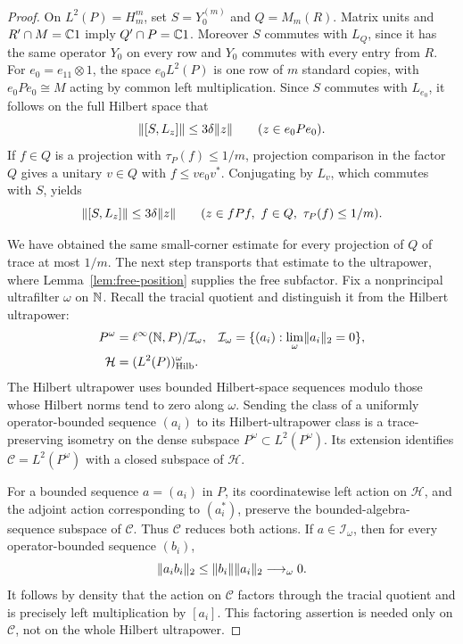\begin{proof}
On \(L^2(P)=H_m^m\), set \(S=Y_0^{(m)}\) and \(Q=M_m(R)\).
Matrix units and \(R'\cap M=\mathbb C1\) imply \(Q'\cap P=\mathbb C1\).
Moreover \(S\) commutes with \(L_Q\), since it has the same operator
\(Y_0\) on every row and \(Y_0\) commutes with every entry from \(R\).
For \(e_0=e_{11}\otimes1\), the space \(e_0L^2(P)\) is one row of
\(m\) standard copies, with \(e_0Pe_0\cong M\) acting by common
left multiplication.  Since \(S\) commutes with \(L_{e_0}\), it follows
on the full Hilbert space that
\[
 \lVert[S,L_z]\rVert\leq3\delta\lVert z\rVert\qquad(z\in e_0Pe_0).
\]
If \(f\in Q\) is a projection with \(\tau_P(f)\leq1/m\), projection
comparison in the factor \(Q\) gives a unitary \(v\in Q\) with
\(f\leq ve_0v^*\).  Conjugating by \(L_v\), which commutes with
\(S\), yields
\[
 \lVert[S,L_z]\rVert\leq3\delta\lVert z\rVert
       \qquad(z\in fPf,\ f\in Q,\ \tau_P(f)\leq1/m).
\]

We have obtained the same small-corner estimate for every projection
of $Q$ of trace at most $1/m$. The next step transports that estimate
to the ultrapower, where Lemma~\ref{lem:free-position} supplies the
free subfactor. Fix a nonprincipal ultrafilter $\omega$ on $\mathbb N$.
Recall the tracial quotient and distinguish it from the Hilbert
ultrapower:
\[
 \begin{aligned}
 P^\omega&=\ell^\infty(\mathbb N,P)/\mathcal I_\omega,
 &\mathcal I_\omega&=
 \{(a_i):\lim_\omega\lVert a_i\rVert_2=0\},\\
 \mathcal H&=(L^2(P))^\omega_{\mathrm{Hilb}}.
 \end{aligned}
\]
The Hilbert ultrapower uses bounded Hilbert-space sequences modulo
those whose Hilbert norms tend to zero along \(\omega\).  Sending
the class of a uniformly operator-bounded sequence \((a_i)\) to its
Hilbert-ultrapower class is a trace-preserving isometry on the
dense subspace \(P^\omega\subset L^2(P^\omega)\).  Its extension
identifies \(\mathcal C=L^2(P^\omega)\) with a closed subspace of
\(\mathcal H\).

For a bounded sequence \(a=(a_i)\) in \(P\), its coordinatewise left
action on \(\mathcal H\), and the adjoint action corresponding to
\((a_i^*)\), preserve the bounded-algebra-sequence subspace of
\(\mathcal C\).  Thus \(\mathcal C\) reduces both actions.  If
\(a\in\mathcal I_\omega\), then for every operator-bounded sequence
\((b_i)\),
\[
 \norm{a_ib_i}_2\leq\norm{b_i}\norm{a_i}_2
                       \longrightarrow_\omega0.
\]
It follows by density that the action on \(\mathcal C\) factors
through the tracial quotient and is precisely left multiplication
by \([a_i]\).  This factoring assertion is needed only on
\(\mathcal C\), not on the whole Hilbert ultrapower.


\end{proof}

